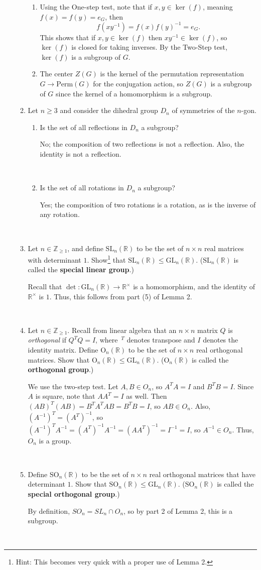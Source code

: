 \documentclass[12pt]{amsart}
\newcommand{\Bold}[1]{\contour{black}{#1}}
\newcommand{\Zc}{Z}
\newcommand{\solution}[1]{\ifthenelse {\equal{\displaysol}{1}} {\begin{framed}{\color{meretale}\noindent #1}\end{framed}} { \ }}
\newcommand\itema{\stepcounter{enumii}\item[{\Bold{(\theenumii)}}]}
\begin{document}
\begin{enumerate}
\begin{enumerate}
{\begin{enumerate}
	\item Using the One-step test, note that if $x, y \in \ker(f)$, meaning $f(x)=f(y)=e_G$, then 
	$$f(xy^{-1})=f(x)f(y)^{-1}=e_G.$$ 
	This shows that if $x,y\in \ker(f)$ then $xy^{-1}\in \ker(f)$, so $\ker(f)$ is closed for taking inverses. By the Two-Step test, $\ker(f)$ is a subgroup of $G$.
	\item The center $\Zc(G)$ is the kernel of the permutation representation $G\to \mathrm{Perm}(G)$ for the conjugation action, so $\Zc(G)$ is a subgroup of $G$ since the kernel of a homomorphism is a subgroup.
\end{enumerate} 
}
\itema Let $n\geq 3$ and consider the dihedral group $D_n$ of symmetries of the $n$-gon. 
\begin{enumerate}
\item Is the set of all reflections in $D_n$ a subgroup?
\solution{No; the composition of two reflections is not a reflection. Also, the identity is not a reflection.}
\item Is the set of all rotations in $D_n$ a subgroup?
\solution{Yes; the composition of two rotations is a rotation, as is the inverse of any rotation.}
\end{enumerate}
\itema Let $n\in \mathbb{Z}_{\geq 1}$, and define $\mathrm{SL}_n(\mathbb{R})$ to be the set of $n\times n$ real matrices with determinant $1$. Show\footnote{Hint: This becomes very quick with a proper use of Lemma 2.} that $\mathrm{SL}_n(\mathbb{R}) \leq \mathrm{GL}_n(\mathbb{R})$. ($\mathrm{SL}_n(\mathbb{R})$ is called the \textbf{special linear group}.)
\solution{Recall that $\det: \mathrm{GL}_n(\mathbb{R}) \to \mathbb{R}^\times$ is a homomorphism, and the identity of $\mathbb{R}^\times$ is $1$. Thus, this follows from part (5) of Lemma 2.}
\itema Let $n\in \mathbb{Z}_{\geq 1}$. Recall from linear algebra that an $n\times n$ matrix $Q$ is \textit{orthogonal} if $Q^T Q = I$, where~${}^T$ denotes transpose and $I$ denotes the identity matrix. Define $\mathrm{O}_n(\mathbb{R})$ to be the set of $n\times n$ real orthogonal matrices. Show that $\mathrm{O}_n(\mathbb{R}) \leq \mathrm{GL}_n(\mathbb{R})$. ($\mathrm{O}_n(\mathbb{R})$ is called the \textbf{orthogonal group}.)
\solution{We use the two-step test. Let $A,B\in O_n$, so $A^T A= I$ and $B^T B=I$. Since $A$ is square, note that $A A^T=I$ as well. Then $(AB)^T (AB) = B^T A^T AB = B^T B = I$, so $AB\in O_n$. Also, $(A^{-1})^T = (A^T)^{-1}$, so $(A^{-1})^T A^{-1} = (A^T)^{-1} A^{-1} = (A A^T)^{-1} = I^{-1} = I$, so $A^{-1}\in O_n$. Thus, $O_n$ is a group.}
\itema Define $\mathrm{SO}_n(\mathbb{R})$ to be the set of $n\times n$ real orthogonal matrices that have determinant $1$. Show that $\mathrm{SO}_n(\mathbb{R}) \leq \mathrm{GL}_n(\mathbb{R})$. ($\mathrm{SO}_n(\mathbb{R})$ is called the \textbf{special orthogonal group}.)
\solution{By definition, $SO_n = SL_n \cap O_n$, so by part 2 of Lemma 2, this is a subgroup.}
\end{enumerate}


\end{enumerate}
\end{document}
